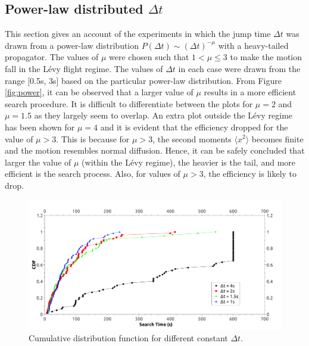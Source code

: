 \documentclass[12pt]{report}
\begin{document}
\begin{justify}
\subsection{Power-law distributed $\Delta t$ }
This section gives an account of the experiments in which the jump time $\Delta t$ was drawn from a power-law distribution $P(\Delta t) \sim (\Delta t) ^{-\mu}$ with a heavy-tailed propagator. The values of $\mu$ were chosen such that $1 < \mu \leq 3$ to make the motion fall in the L\'evy flight regime. The values of $\Delta t$ in each case were drawn from the range [0.5s, 3s] based on the particular power-law distribution. From Figure \ref{fig:power}, it can be observed that a larger value of $\mu$ results in a more efficient search procedure. It is difficult to differentiate between the plots for $\mu = 2$ and $\mu = 1.5$ as they largely seem to overlap. An extra plot outside the L\'evy regime has been shown for $\mu = 4$ and it is evident that the efficiency dropped for the value of $\mu > 3$. This is because for $\mu > 3$, the second moments $\langle x^2 \rangle$ becomes finite and the motion resembles normal diffusion.  Hence, it can be safely concluded that larger the value of $\mu$ (within the L\'evy regime), the heavier is the tail, and more efficient is the search process. Also, for values of $\mu > 3$, the efficiency is likely to drop.

\begin{figure}[H]
\centering
\includegraphics[width = 14cm, keepaspectratio]{constant_T.pdf}
\caption{Cumulative distribution function for different constant $\Delta t$.}
\label{fig:constT}
\end{figure}


\end{justify}
\end{document}
